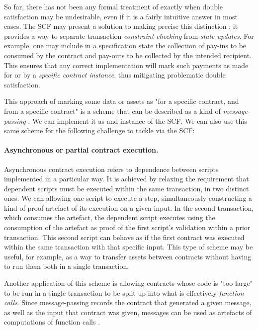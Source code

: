 So far, there has not been any formal treatment of exactly when double satisfaction
may be undesirable, even if it is a fairly intuitive answer in most cases.
The SCF may present a solution to making precise this distinction : it provides
a way to separate transaction \emph{constraint checking} from \emph{state updates}.
For example, one may include in a specification state the collection of pay-ins to be
consumed by the contract and pay-outs to be collected by the intended recipient.
This ensures that any correct implementation will mark such payments as made for or
by a \emph{specific contract instance}, thus mitigating problematic double satisfaction.

This approach of marking some data or assets as "for a specific contract, and from
a specific contract" is a
scheme that can be described as a kind of \emph{message-passing} \cite{messages}.
We can implement
it as and instance of the SCF. We can also use this same scheme for the following
challenge to tackle via the SCF:

\paragraph{Asynchronous or partial contract execution. } Asynchronous contract
execution refers to dependence between scripts implemented in a particular way.
It is achieved
by relaxing the requirement that dependent scripts must be executed within the same transaction,
in two distinct ones. We can allowing one script to execute a step,
simultaneously constructing a kind of proof artefact of its
execution on a given input. In the second transaction, which consumes the artefact,
the dependent script executes using the consumption of the artefact as proof of
the first script’s validation within a prior transaction.
This second script can behave as if the first contract was executed within the same transaction
with that specific input.
This type of scheme may be useful, for example, as a way to transfer assets
between contracts without having to run them both in a single transaction.

Another application of this scheme is allowing contracts whose code is "too large"
to be run in a single transaction to be split up into what is effectively
\emph{function calls}. Since message-passing records the contract that generated
a given message, as well as the input that contract was given, messages can
be used as artefacts of computations of function calls \cite{messages}.


